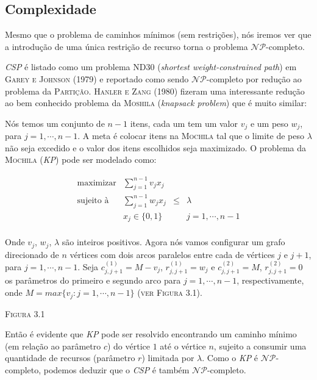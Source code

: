 \documentclass[10pt,a4paper]{article}
\begin{document}
\subsection{Complexidade}

Mesmo que o problema de caminhos mínimos (sem restrições), nós iremos 
ver que a introdução de uma única restrição de recurso torna o problema 
$\mathcal{NP}$-completo.

\emph{CSP} é listado como um problema \textsc{ND30} (\emph{shortest 
weight-constrained path}) em \textsc{Garey e Johnson (1979)} e reportado 
como sendo $\mathcal{NP}$-completo  por redução ao problema da 
\textsc{Partição}. \textsc{Hanler e Zang (1980)} fizeram uma 
interessante redução ao bem conhecido problema da \textsc{Moshila} 
(\emph{knapsack problem}) que é muito similar:

Nós temos um conjunto de $n-1$ itens, cada um tem um valor $v_j$ e um 
peso $w_j$, para $j = 1, \cdots, n - 1$. A meta é colocar itens na 
\textsc{Mochila} tal que o limite de peso $\lambda$ não seja excedido e 
o valor dos itens escolhidos seja maximizado. O problema da 
\textsc{Mochila} (\emph{KP}) pode ser modelado como:

\[
  \begin{array}{lrcl}
  \textrm{maximizar}	& \displaystyle\sum_{j=1}^{n-1}{v_jx_j}	&     	&   
  \\
  \textrm{sujeito à}	& \displaystyle\sum_{j=1}^{n-1}{w_jx_j}	& \le 	& 
  \lambda \\
    & x_j \in \{0, 1\}     						&  		& j = 1, \cdots, n - 1 \\
  \end{array}
\]

Onde $v_j$, $w_j$, $\lambda$ são inteiros positivos. Agora nós vamos 
configurar um grafo direcionado de $n$ vértices com dois arcos paralelos 
entre cada de vértices $j$ e $j+1$, para $j = 1, \cdots, n - 1$. Seja 
$c^{(1)}_{j,j+1} = M - v_j$, $r^{(1)}_{j,j+1} = w_j$ e
$c^{(2)}_{j,j+1} = M      $, $r^{(2)}_{j,j+1} = 0  $ os parâmetros do 
primeiro e segundo arco para $j = 1, \cdots, n - 1$, respectivamente, 
onde $M = max\{v_j : j = 1, \cdots, n - 1\}$ (\textsc{ver Figura 3.1}).

\textsc{Figura 3.1}

Então é evidente que \emph{KP} pode ser resolvido encontrando um caminho 
mínimo (em relação ao parâmetro $c$) do vértice $1$ até o vértice $n$, 
sujeito a consumir uma quantidade de recursos (parâmetro $r$) limitada 
por $\lambda$. Como o \emph{KP} é $\mathcal{NP}$-completo, podemos 
deduzir que o \emph{CSP} é também $\mathcal{NP}$-completo.
\end{document}
